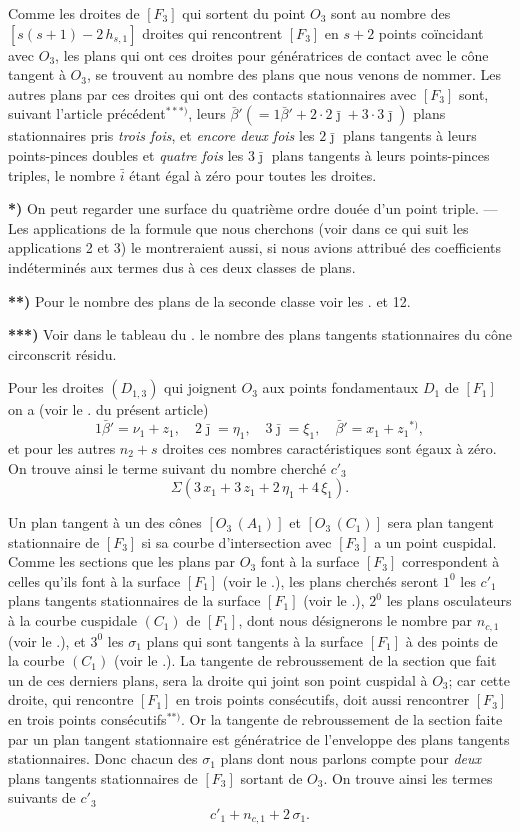 \documentclass{article}
\begin{document}
Comme les droites de $[F_3]$ qui sortent du point $O_3$ sont au nombre des $[s(s + 1) - 2\,h_{s, 1}]$ droites qui rencontrent $[F_3]$ en $s + 2$ points coïncidant avec $O_3$, les plans qui ont ces droites pour génératrices de contact avec le cône tangent à $O_3$, se trouvent au nombre des plans que nous venons de nommer. Les autres plans par ces droites qui ont des contacts stationnaires avec $[F_3]$ sont, suivant l'article précédent${}^{***)}$, leurs $\bar{\beta}' (= 1\bar{\beta}' + 2\cdot 2\bar{\jmath} + 3\cdot 3\bar{\jmath})$ plans stationnaires pris \emph{trois fois}, et \emph{encore deux fois} les $2\bar{\jmath}$ plans tangents à leurs points-pinces doubles et \emph{quatre fois} les $3\bar{\jmath}$ plans tangents à leurs points-pinces triples, le nombre $\bar{i}$ étant égal à zéro pour toutes les droites.

\textbf{*)} On peut regarder une surface du quatrième ordre douée d'un point triple. --- Les applications de la formule que nous cherchons (voir dans ce qui suit les applications 2 et 3) le montreraient aussi, si nous avions attribué des coefficients indéterminés aux termes dus à ces deux classes de plans.

\textbf{**)} Pour le nombre des plans de la seconde classe voir les . et 12.

\textbf{***)} Voir dans le tableau du . le nombre des plans tangents stationnaires du cône circonscrit résidu.

Pour les droites $(D_{1, 3})$ qui joignent $O_3$ aux points fondamentaux $D_1$ de $[F_1]$ on a (voir le . du présent article)
\[
1\bar{\beta}' = \nu_1 + z_1, \quad 2\bar{\jmath} = \eta_1, \quad 3\bar{\jmath} = \xi_1, \quad \bar{\beta}' = x_1 + z_1{}^{*)},
\]
et pour les autres $n_2 + s$ droites ces nombres caractéristiques sont égaux à zéro. On trouve ainsi le terme suivant du nombre cherché $c'_3$
\[
\Sigma(3\,x_1 + 3\,z_1 + 2\,\eta_1 + 4\,\xi_1).
\]

Un plan tangent à un des cônes $[O_3\,(A_1)]$ et $[O_3\,(C_1)]$ sera plan tangent stationnaire de $[F_3]$ si sa courbe d'intersection avec $[F_3]$ a un point cuspidal. Comme les sections que les plans par $O_3$ font à la surface $[F_3]$ correspondent à celles qu'ils font à la surface $[F_1]$ (voir le .), les plans cherchés seront $1^0$ les $c'_1$ plans tangents stationnaires de la surface $[F_1]$ (voir le .), $2^0$ les plans osculateurs à la courbe cuspidale $(C_1)$ de $[F_1]$, dont nous désignerons le nombre par $n_{c, 1}$ (voir le .), et $3^0$ les $\sigma_1$ plans qui sont tangents à la surface $[F_1]$ à des points de la courbe $(C_1)$ (voir le .). La tangente de rebroussement de la section que fait un de ces derniers plans, sera la droite qui joint son point cuspidal à $O_3$; car cette droite, qui rencontre $[F_1]$ en trois points consécutifs, doit aussi rencontrer $[F_3]$ en trois points consécutifs${}^{**)}$. Or la tangente de rebroussement de la section faite par un plan tangent stationnaire est génératrice de l'enveloppe des plans tangents stationnaires. Donc chacun des $\sigma_1$ plans dont nous parlons compte pour \emph{deux} plans tangents stationnaires de $[F_3]$ sortant de $O_3$. On trouve ainsi les termes suivants de $c'_3$
\[
c'_1 + n_{c, 1} + 2\,\sigma_1.
\]
\end{document}
